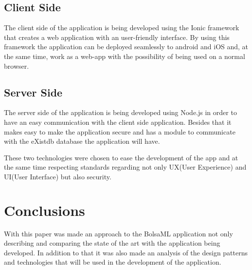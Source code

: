 \documentclass[twocolumn,twoside,11pt,a4paper]{article}
\begin{document}
\subsection{Client Side}

The client side of the application is being developed using the Ionic framework that creates a web application with an user-friendly interface. By using this framework the application can be deployed seamlessly to android and iOS and, at the same time, work as a web-app with the possibility of being used on a normal browser.

\subsection{Server Side}

The server side of the application is being developed using Node.js in order to have an easy communication with the client side application. Besides that it makes easy to make the application secure and has a module to communicate with the eXistdb database the application will have.


These two technologies were chosen to ease the development of the app and at the same time respecting standards regarding not only UX(User Experience) and UI(User Interface) but also security.


\section{Conclusions}\label{sec:conclusions}

With this paper was made an approach to the BolsaML application not only describing and comparing the state of the art with the application being developed. In addition to that it was also made an analysis of the design patterns and technologies that will be used in the development of the application.


\renewcommand{\bibname}{Referências}
%
%

%


\end{document}
